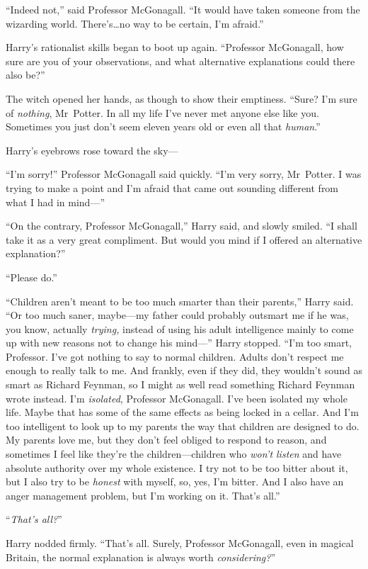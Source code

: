 “Indeed not,” said Professor McGonagall. “It would have taken someone from the wizarding world. There’s…no way to be certain, I’m afraid.”

Harry’s rationalist skills began to boot up again. “Professor McGonagall, how sure are you of your observations, and what alternative explanations could there also be?”

The witch opened her hands, as though to show their emptiness. “Sure? I’m sure of \emph{nothing}, Mr~Potter. In all my life I’ve never met anyone else like you. Sometimes you just don’t seem eleven years old or even all that \emph{human}.”

Harry’s eyebrows rose toward the sky—

“I’m sorry!” Professor McGonagall said quickly. “I’m very sorry, Mr~Potter. I was trying to make a point and I’m afraid that came out sounding different from what I had in mind—”

“On the contrary, Professor McGonagall,” Harry said, and slowly smiled. “I shall take it as a very great compliment. But would you mind if I offered an alternative explanation?”

“Please do.”

“Children aren’t meant to be too much smarter than their parents,” Harry said. “Or too much saner, maybe—my father could probably outsmart me if he was, you know, actually \emph{trying,} instead of using his adult intelligence mainly to come up with new reasons not to change his mind—” Harry stopped. “I’m too smart, Professor. I’ve got nothing to say to normal children. Adults don’t respect me enough to really talk to me. And frankly, even if they did, they wouldn’t sound as smart as Richard Feynman, so I might as well read something Richard Feynman wrote instead. I’m \emph{isolated}, Professor McGonagall. I’ve been isolated my whole life. Maybe that has some of the same effects as being locked in a cellar. And I’m too intelligent to look up to my parents the way that children are designed to do. My parents love me, but they don’t feel obliged to respond to reason, and sometimes I feel like they’re the children—children who \emph{won’t listen} and have absolute authority over my whole existence. I try not to be too bitter about it, but I also try to be \emph{honest} with myself, so, yes, I’m bitter. And I also have an anger management problem, but I’m working on it. That’s all.”

“\emph{That’s all?}”

Harry nodded firmly. “That’s all. Surely, Professor McGonagall, even in magical Britain, the normal explanation is always worth \emph{considering?}”

